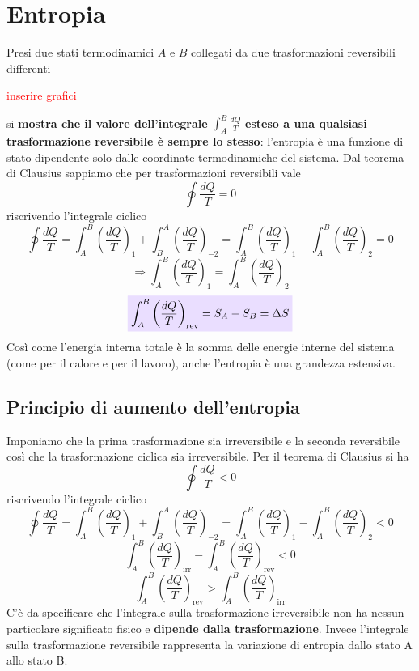\documentclass[x11names]{report}
\newcommand{\viola}[1]{\colorbox{yred}{$\displaystyle #1$}}
\begin{document}
	\section{Entropia}
	Presi due stati termodinamici \(A\) e \(B\) collegati da due trasformazioni reversibili differenti
	\begin{center}
		\textcolor{red}{inserire grafici}
	\end{center}
	si \textbf{mostra che il valore dell'integrale} \(\int_{A}^{B}\frac{dQ}{T}\) \textbf{esteso a una qualsiasi trasformazione reversibile è sempre lo stesso}: l'entropia è una funzione di stato dipendente solo dalle coordinate termodinamiche del sistema. Dal teorema di Clausius sappiamo che per trasformazioni reversibili vale
	\[ 
	\oint \frac{dQ}{T} = 0 
	\]
	riscrivendo l'integrale ciclico
	\[ 
	\oint \frac{dQ}{T} = \int_{A}^{B}\left(\frac{dQ}{T}\right)_{1} + \int_{B}^{A}\left(\frac{dQ}{T}\right)_{-2} = \int_{A}^{B}\left(\frac{dQ}{T}\right)_{1} - \int_{A}^{B}\left(\frac{dQ}{T}\right)_{2} = 0
	\]
	\[ 
	\Rightarrow \int_{A}^{B}\left(\frac{dQ}{T}\right)_{1} = \int_{A}^{B}\left(\frac{dQ}{T}\right)_{2}
	\]
	\begin{equation}
		\viola{\int_{A}^{B}\left(\frac{dQ}{T}\right)_{\text{rev}} = S_{A} - S_{B} = \Delta S}
	\end{equation}
	Così come l'energia interna totale è la somma delle energie interne del sistema (come per il calore e per il lavoro), anche l'entropia è una grandezza estensiva. 
	
	\subsection{Principio di aumento dell'entropia}
	Imponiamo che la prima trasformazione sia irreversibile e la seconda reversibile così che la trasformazione ciclica sia irreversibile. Per il teorema di Clausius si ha
	\[ 
	\oint \frac{dQ}{T} < 0
	\]
	riscrivendo l'integrale ciclico
	\[ 
	\oint \frac{dQ}{T} = \int_{A}^{B}\left(\frac{dQ}{T}\right)_{1} + \int_{B}^{A}\left(\frac{dQ}{T}\right)_{-2} = \int_{A}^{B}\left(\frac{dQ}{T}\right)_{1} - \int_{A}^{B}\left(\frac{dQ}{T}\right)_{2} < 0
	\]
	\[ 
	\int_{A}^{B}\left(\frac{dQ}{T}\right)_{\text{irr}} - \int_{A}^{B}\left(\frac{dQ}{T}\right)_{\text{rev}} < 0
	\]
	\[ 
	\int_{A}^{B}\left(\frac{dQ}{T}\right)_{\text{rev}} > \int_{A}^{B}\left(\frac{dQ}{T}\right)_{\text{irr}} 
	\]
	C'è da specificare che l'integrale sulla trasformazione irreversibile non ha nessun particolare significato fisico e \textbf{dipende dalla trasformazione}. Invece l'integrale sulla trasformazione reversibile rappresenta la variazione di entropia dallo stato A allo stato B.
	
\end{document}
